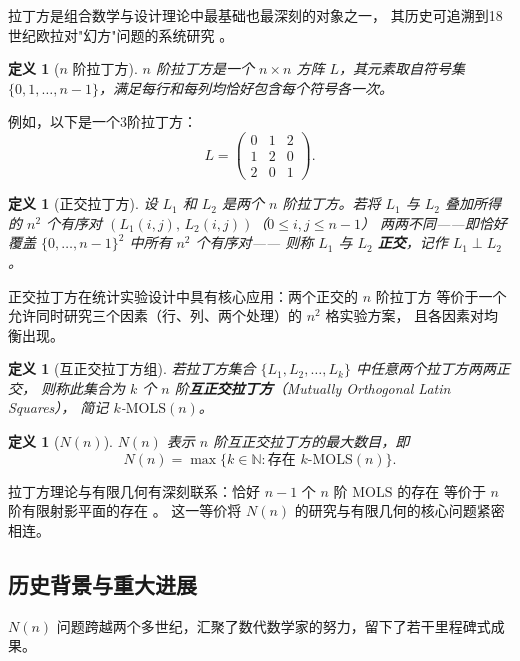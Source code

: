 \documentclass[11pt,a4paper]{ctexart}
\newtheorem{definition}[theorem]{定义}
\theoremstyle{remark}
\newcommand{\MOLS}{\mathrm{MOLS}}
\begin{document}
拉丁方是组合数学与设计理论中最基础也最深刻的对象之一，
其历史可追溯到18世纪欧拉对"幻方"问题的系统研究 \cite{euler1782}。

\begin{definition}[$n$ 阶拉丁方]
  $n$ 阶拉丁方是一个 $n \times n$ 方阵 $L$，其元素取自符号集
  $\{0, 1, \ldots, n-1\}$，满足每行和每列均恰好包含每个符号各一次。
\end{definition}

例如，以下是一个3阶拉丁方：
\[
  L = \begin{pmatrix}
    0 & 1 & 2 \\
    1 & 2 & 0 \\
    2 & 0 & 1
  \end{pmatrix}.
\]

\begin{definition}[正交拉丁方]
  设 $L_1$ 和 $L_2$ 是两个 $n$ 阶拉丁方。若将 $L_1$ 与 $L_2$
  叠加所得的 $n^2$ 个有序对 $(L_1(i,j),\, L_2(i,j))$（$0 \le i, j \le n-1$）
  两两不同——即恰好覆盖 $\{0,\ldots,n-1\}^2$ 中所有 $n^2$ 个有序对——
  则称 $L_1$ 与 $L_2$ \textbf{正交}，记作 $L_1 \perp L_2$。
\end{definition}

正交拉丁方在统计实验设计中具有核心应用：两个正交的 $n$ 阶拉丁方
等价于一个允许同时研究三个因素（行、列、两个处理）的 $n^2$ 格实验方案，
且各因素对均衡出现。

\begin{definition}[互正交拉丁方组]
  若拉丁方集合 $\{L_1, L_2, \ldots, L_k\}$ 中任意两个拉丁方两两正交，
  则称此集合为 $k$ 个 $n$ 阶\textbf{互正交拉丁方}（Mutually Orthogonal Latin Squares），
  简记 $k$-$\MOLS(n)$。
\end{definition}

\begin{definition}[$N(n)$]
  $N(n)$ 表示 $n$ 阶互正交拉丁方的最大数目，即
  \[
    N(n) = \max\{k \in \mathbb{N} : \text{存在 } k\text{-}\MOLS(n)\}.
  \]
\end{definition}

拉丁方理论与有限几何有深刻联系：恰好 $n-1$ 个 $n$ 阶 $\MOLS$ 的存在
等价于 $n$ 阶有限射影平面的存在 \cite{colbourn2006,denes1991}。
这一等价将 $N(n)$ 的研究与有限几何的核心问题紧密相连。

\subsection{历史背景与重大进展}

$N(n)$ 问题跨越两个多世纪，汇聚了数代数学家的努力，留下了若干里程碑式成果。
\end{document}
